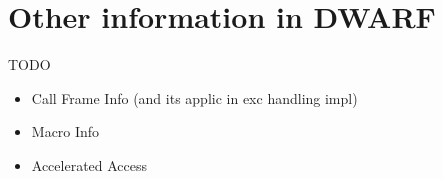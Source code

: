 
\section{Other information in DWARF}


\begin{frame}{TODO}
\begin{itemize}
\item Call Frame Info (and its applic in exc handling impl)
\item Macro Info
\item Accelerated Access
\end{itemize}
\end{frame}
